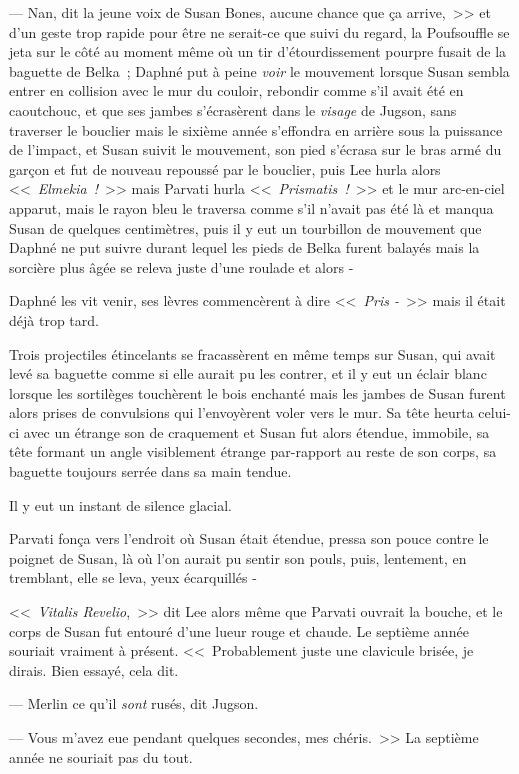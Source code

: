 --- Nan, dit la jeune voix de Susan Bones, aucune chance que ça arrive,~>> et d'un geste trop rapide pour être ne serait-ce que suivi du regard, la Poufsouffle se jeta sur le côté au moment même où un tir d'étourdissement pourpre fusait de la baguette de Belka~; Daphné put à peine \emph{voir} le mouvement lorsque Susan sembla entrer en collision avec le mur du couloir, rebondir comme s'il avait été en caoutchouc, et que ses jambes s'écrasèrent dans le \emph{visage} de Jugson, sans traverser le bouclier mais le sixième année s'effondra en arrière sous la puissance de l'impact, et Susan suivit le mouvement, son pied s'écrasa sur le bras armé du garçon et fut de nouveau repoussé par le bouclier, puis Lee hurla alors <<~\emph{Elmekia~!}~>> mais Parvati hurla <<~\emph{Prismatis~!}~>> et le mur arc-en-ciel apparut, mais le rayon bleu le traversa comme s'il n'avait pas été là et manqua Susan de quelques centimètres, puis il y eut un tourbillon de mouvement que Daphné ne put suivre durant lequel les pieds de Belka furent balayés mais la sorcière plus âgée se releva juste d'une roulade et alors -

Daphné les vit venir, ses lèvres commencèrent à dire <<~\emph{Pris -}~>> mais il était déjà trop tard.

Trois projectiles étincelants se fracassèrent en même temps sur Susan, qui avait levé sa baguette comme si elle aurait pu les contrer, et il y eut un éclair blanc lorsque les sortilèges touchèrent le bois enchanté mais les jambes de Susan furent alors prises de convulsions qui l'envoyèrent voler vers le mur. Sa tête heurta celui-ci avec un étrange son de craquement et Susan fut alors étendue, immobile, sa tête formant un angle visiblement étrange par-rapport au reste de son corps, sa baguette toujours serrée dans sa main tendue.

Il y eut un instant de silence glacial.

Parvati fonça vers l'endroit où Susan était étendue, pressa son pouce contre le poignet de Susan, là où l'on aurait pu sentir son pouls, puis, lentement, en tremblant, elle se leva, yeux écarquillés -

<<~\emph{Vitalis Revelio},~>> dit Lee alors même que Parvati ouvrait la bouche, et le corps de Susan fut entouré d'une lueur rouge et chaude. Le septième année souriait vraiment à présent. <<~Probablement juste une clavicule brisée, je dirais. Bien essayé, cela dit.

--- Merlin ce qu'il \emph{sont} rusés, dit Jugson.

--- Vous m'avez eue pendant quelques secondes, mes chéris.~>> La septième année ne souriait pas du tout.

